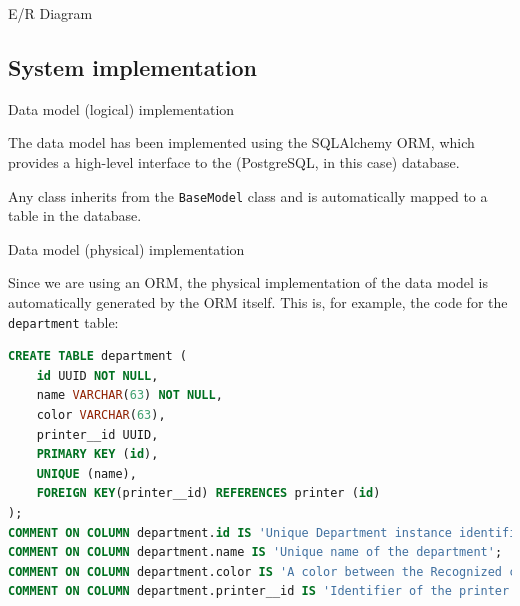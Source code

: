 \begin{frame}[allowframebreaks]{E/R Diagram}
\end{frame}

\subsection{System implementation}

\begin{frame}[allowframebreaks]{Data model (logical) implementation}

	The data model has been implemented using the SQLAlchemy ORM, which
	provides a high-level interface to the (PostgreSQL, in this case) database.

	

	Any class inherits from the \texttt{BaseModel} class and is automatically
	mapped to a table in the database.

	\framebreak

	\vspace*{-1\baselineskip}
	

\end{frame}

\begin{frame}[fragile]{Data model (physical) implementation}

	Since we are using an ORM, the physical implementation of the data model is
	automatically generated by the ORM itself.
	This is, for example, the code for the \texttt{department} table:

	\begin{lstlisting}[language=SQL]
CREATE TABLE department (
	id UUID NOT NULL,
	name VARCHAR(63) NOT NULL,
	color VARCHAR(63),
	printer__id UUID,
	PRIMARY KEY (id),
	UNIQUE (name),
	FOREIGN KEY(printer__id) REFERENCES printer (id)
);
COMMENT ON COLUMN department.id IS 'Unique Department instance identifier';
COMMENT ON COLUMN department.name IS 'Unique name of the department';
COMMENT ON COLUMN department.color IS 'A color between the Recognized color keyword names. See also https://www.w3.org/TR/SVG11/types.html#ColorKeywords';
COMMENT ON COLUMN department.printer__id IS 'Identifier of the printer the department is equipped with';\end{lstlisting}

\end{frame}

